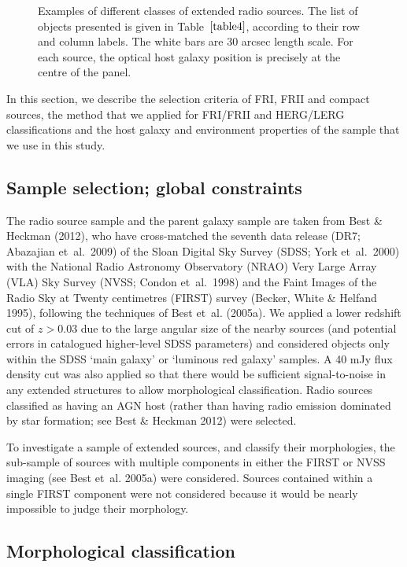\documentclass[usenatbib]{mn2e}
\begin{document}
\begin{figure*}
\center
{}
\caption{Examples of different classes of extended radio sources. The list
  of objects presented is given in Table~$\ref{table4}$, according to their row and
  column labels. The white bars are 30 arcsec length scale. For each source, 
  the optical host galaxy position is precisely at the centre of the panel.}
\label{14}
\end{figure*}

 In this section, we describe the selection criteria of FRI, 
FRII and compact sources, the method that we applied for FRI/FRII 
and HERG/LERG classifications and the host galaxy and environment properties of the sample that we use
in this study.


\subsection {Sample selection; global constraints}
 The radio source sample and the parent galaxy sample are taken from Best
\& Heckman (2012), who have cross-matched the seventh data release (DR7;
Abazajian et~al.\ 2009) of the Sloan Digital Sky Survey (SDSS; York
et~al.\ 2000) with the National Radio Astronomy Observatory (NRAO) Very
Large Array (VLA) Sky Survey (NVSS; Condon et~al.\ 1998) and the Faint
Images of the Radio Sky at Twenty centimetres (FIRST) survey (Becker,
White \& Helfand 1995), following the techniques of Best et~al. (2005a). We
applied a lower redshift cut of $z>0.03$ due to the
large angular size of the nearby sources (and potential errors in
catalogued higher-level SDSS parameters) and considered objects only within 
the SDSS `main galaxy' or `luminous red galaxy' samples. 
A 40 mJy flux density cut was also applied so that there would be sufficient
signal-to-noise in any extended structures to allow morphological
classification. Radio sources classified as having an AGN host
(rather than having radio emission dominated by star formation; see Best
\& Heckman 2012) were selected. 

To investigate a sample of extended sources, and classify their morphologies,
 the sub-sample of sources with multiple components in either the FIRST or 
NVSS imaging (see Best et~al. 2005a) were considered.  Sources contained
 within a single FIRST component were not considered because it would be
nearly impossible to judge their morphology. 

\subsection {Morphological classification}
\end{document}

